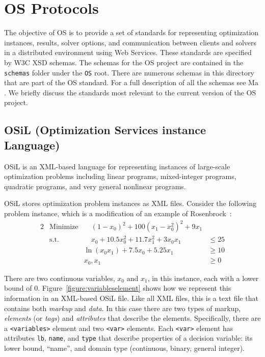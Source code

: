 \documentclass[11pt]{article}
\newcounter{Fig}
\renewcommand{\_}{{\char"5F}}
\renewcommand{\{}{{\char"7B}}
\renewcommand{\}}{{\char"7D}}
\renewcommand{\^}{{\char"0D}}
\renewcommand{\'}{{\char"0D}}
\begin{document}
\begin{enumerate}[Step 1:]
\begin{itemize}
\end{itemize}


\section{OS Protocols}\label{section:schemadescriptions}

The objective of OS is to provide a set of standards for representing optimization instances, results, solver options,
and communication between clients and solvers in a distributed environment using Web Services.  These standards are
specified by W3C XSD schemas. The schemas for the OS project are contained in the {\tt schemas} folder under the
{\tt OS} root. There are numerous schemas in this directory that are part of the OS standard.
For a full description of all the schemas see  Ma \cite{junma2005}.  We briefly discuss the standards most relevant
to the current version of the OS project.


\subsection{OSiL (Optimization Services instance Language)} \label{section:osilschema}
OSiL is
an XML-based language for representing instances of large-scale
optimization problems including linear programs, mixed-integer programs,
quadratic programs, and very general nonlinear programs.

OSiL stores optimization problem instances as XML files.  Consider the following problem instance, which is a
modification of an example of Rosenbrock~\cite{rosenbrock1960}:
%
\begin{alignat}{2}
& \mbox{Minimize} & \quad (1 - x_{0})^{2} + 100(x_{1} - x_{0}^{2})^{2} + 9x_{1} \label{eq:roobj}\\
& \mbox{s.t.} & \quad x_{0} + 10.5 x_{0}^{2} + 11.7 x_{1}^{2} + 3x_{0}x_{1}  &\le 25  \label{eq:ro1}\\
& & \ln(x_{0} x_{1}) + 7.5 x_{0} + 5.25 x_{1} &\ge 10 \label{eq:ro2}\\
& & x_{0}, x_{1} &\ge 0 \label{eq:ro3}
\end{alignat}


There are two continuous variables, $x_{0}$ and $x_{1}$, in this instance, each with a lower bound of 0.
Figure~\ref{figure:variableselement} shows how we represent this information in an XML-based OSiL file.
Like all XML files, this is a text file that contains both {\it markup} and {\it data}. In this case there
are two types of markup, {\it elements} (or {\it tags}\/) and {\it attributes} that describe the elements.
Specifically, there are a {\tt <variables>} element and two {\tt <var>} elements. Each {\tt <var>}
element has attributes {\tt lb}, {\tt name}, and {\tt type} that
describe properties of a decision variable: its lower bound, ``name'', and
domain type (continuous, binary, general integer).



\end{enumerate}
\end{document}
